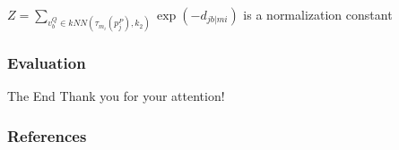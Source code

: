 \documentclass[hyperref={pdfpagelabels=false}]{beamer}
\begin{document}
\begin{frame}[allowframebreaks]
\begin{itemize}
\end{itemize}

$Z = \sum_{v_b^Q\in kNN(\tau_{m_i}(p_j^P),k_2)}\exp(-d_{jb|mi})$ is a normalization constant

\end{frame}




\begin{frame}
\frametitle{Evaluation}
\end{frame}
\begin{frame}{The End}
\centering
\LARGE
\color{red}
 Thank you for your attention!
\end{frame}

\begin{frame}
	\frametitle{References}
	
	
\end{frame} 
\end{document}
